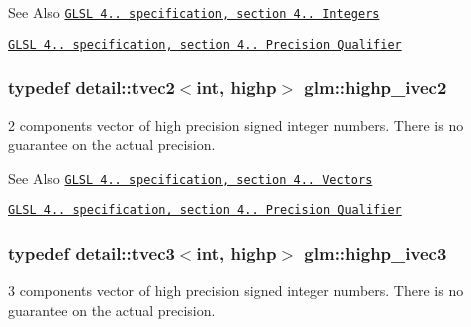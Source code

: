 \begin{DoxySeeAlso}{See Also}
\href{http://www.opengl.org/registry/doc/GLSLangSpec.4.20.8.pdf}{\tt G\-L\-S\-L 4.. specification, section 4.. Integers} 

\href{http://www.opengl.org/registry/doc/GLSLangSpec.4.20.8.pdf}{\tt G\-L\-S\-L 4.. specification, section 4.. Precision Qualifier} 
\end{DoxySeeAlso}
\hypertarget{group__core__precision_gab2bac6095f51f7d7f74747afc2f6747a}{
\subsubsection[{highp\-\_\-ivec2}]{\setlength{\rightskip}{0pt plus 5cm}typedef detail\-::tvec2$<$int, highp$>$ {\bf glm\-::highp\-\_\-ivec2}}}\label{group__core__precision_gab2bac6095f51f7d7f74747afc2f6747a}
2 components vector of high precision signed integer numbers. There is no guarantee on the actual precision.

\begin{DoxySeeAlso}{See Also}
\href{http://www.opengl.org/registry/doc/GLSLangSpec.4.20.8.pdf}{\tt G\-L\-S\-L 4.. specification, section 4.. Vectors} 

\href{http://www.opengl.org/registry/doc/GLSLangSpec.4.20.8.pdf}{\tt G\-L\-S\-L 4.. specification, section 4.. Precision Qualifier} 
\end{DoxySeeAlso}
\hypertarget{group__core__precision_gae9f0a321de8ee92dce9d4400362d71e7}{
\subsubsection[{highp\-\_\-ivec3}]{\setlength{\rightskip}{0pt plus 5cm}typedef detail\-::tvec3$<$int, highp$>$ {\bf glm\-::highp\-\_\-ivec3}}}\label{group__core__precision_gae9f0a321de8ee92dce9d4400362d71e7}
3 components vector of high precision signed integer numbers. There is no guarantee on the actual precision.

